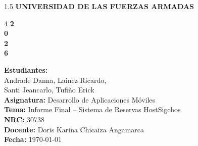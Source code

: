\documentclass{article}
\begin{document}
\begin{titlepage}
\thispagestyle{empty}
\begin{spacing}{1.5}
{\huge \bfseries UNIVERSIDAD DE LAS FUERZAS ARMADAS}\\[10pt]
\centering
\end{spacing}
\vspace{1cm}
\begin{minipage}{2cm}
\hspace{0.5cm}
\end{minipage}\hfill
\begin{minipage}{9cm}
\end{minipage}\hfill
\begin{minipage}{3cm}
\hspace{1cm}
\vspace{1.cm}
\begin{spacing}{4}
 {\color{white}\fontsize{60}{70}\selectfont\bfseries 2\\0\\2\\6}
\end{spacing}
\end{minipage}

\vspace{4cm}
\begin{flushleft}
{\LARGE
\textbf{Estudiantes:}\\
\hspace{1cm} Andrade Danna, Lainez Ricardo, \\
\hspace{1cm} Santi Jeancarlo, Tufiño Erick\\[10pt]
\textbf{Asignatura:} Desarrollo de Aplicaciones Móviles\\
\textbf{Tema:} Informe Final -- Sistema de Reservas HostSigchos\\
\textbf{NRC:} 30738\\
\textbf{Docente:} Doris Karina Chicaiza Angamarca\\
\textbf{Fecha:} \today\\}
\end{flushleft}
\end{titlepage}
\restoregeometry
\newpage
\end{document}
